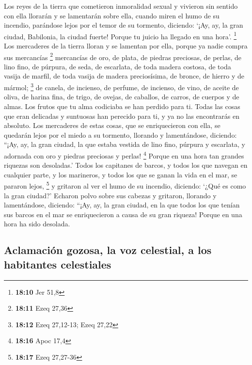  Los reyes de la tierra que cometieron inmoralidad sexual
y vivieron sin sentido con ella llorarán y se lamentarán sobre ella,
cuando miren el humo de su incendio,  parándose lejos por
el temor de su tormento, diciendo: `¡Ay, ay, la gran ciudad, Babilonia,
la ciudad fuerte! Porque tu juicio ha llegado en una hora'. \footnote{\textbf{18:10}
  Jer 51,8}  Los mercaderes de la tierra lloran y se
lamentan por ella, porque ya nadie compra sus mercancías \footnote{\textbf{18:11}
  Ezeq 27,36}  mercancías de oro, de plata, de piedras
preciosas, de perlas, de lino fino, de púrpura, de seda, de escarlata,
de toda madera costosa, de toda vasija de marfil, de toda vasija de
madera preciosísima, de bronce, de hierro y de mármol; \footnote{\textbf{18:12}
  Ezeq 27,12-13; Ezeq 27,22}  de canela, de incienso, de
perfume, de incienso, de vino, de aceite de oliva, de harina fina, de
trigo, de ovejas, de caballos, de carros, de cuerpos y de almas.
 Los frutos que tu alma codiciaba se han perdido para ti.
Todas las cosas que eran delicadas y suntuosas han perecido para ti, y
ya no las encontrarás en absoluto.  Los mercaderes de
estas cosas, que se enriquecieron con ella, se quedarán lejos por el
miedo a su tormento, llorando y lamentándose,  diciendo:
``¡Ay, ay, la gran ciudad, la que estaba vestida de lino fino, púrpura y
escarlata, y adornada con oro y piedras preciosas y perlas! \footnote{\textbf{18:16}
  Apoc 17,4}  Porque en una hora tan grandes riquezas son
desoladas.' Todos los capitanes de barcos, y todos los que navegan en
cualquier parte, y los marineros, y todos los que se ganan la vida en el
mar, se pararon lejos, \footnote{\textbf{18:17} Ezeq 27,27-36}
 y gritaron al ver el humo de su incendio, diciendo:
`¿Qué es como la gran ciudad?'  Echaron polvo sobre sus
cabezas y gritaron, llorando y lamentándose, diciendo: ``¡Ay, ay, la
gran ciudad, en la que todos los que tenían sus barcos en el mar se
enriquecieron a causa de su gran riqueza! Porque en una hora ha sido
desolada.

\hypertarget{aclamaciuxf3n-gozosa-la-voz-celestial-a-los-habitantes-celestiales}{%
\subsection{Aclamación gozosa, la voz celestial, a los habitantes
celestiales}\label{aclamaciuxf3n-gozosa-la-voz-celestial-a-los-habitantes-celestiales}}

